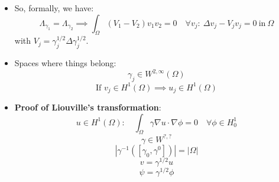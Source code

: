 \documentclass{article}
\begin{document}
\begin{itemize}
    \item So, formally, we have:
    \begin{equation}
        \Lambda_{\gamma_1} = \Lambda_{\gamma_2} \implies \int_\Omega (V_1 - V_2)v_1v_2 = 0 \quad \forall v_j: \ \Delta v_j - V_j v_j = 0 \ \text{in} \ \Omega
    \end{equation}
    with $V_j = \gamma_j^{1/2} \Delta \gamma_j^{1/2}$.

    \item Spaces where things belong:
    \begin{equation}
        \gamma_j \in W^{2, \infty}(\Omega)
    \end{equation}
    \begin{equation}
        \text{If } v_j \in H^1(\Omega) \implies u_j \in H^1(\Omega)
    \end{equation}

    \item \textbf{Proof of Liouville's transformation}:
    \begin{equation}
        u \in H^1(\Omega): \quad \int_\Omega \gamma \nabla u \cdot \nabla \phi = 0 \quad \forall \phi \in H_0^1
    \end{equation}
    \begin{equation}
        \gamma \in W^{?,?}
    \end{equation}
    \begin{equation}
        |\gamma^{-1} ([\gamma_0, \gamma^0])| = |\Omega|
    \end{equation}
    \begin{equation}
        v = \gamma^{1/2} u
    \end{equation}
    \begin{equation}
        \psi = \gamma^{1/2} \phi
    \end{equation}


\end{itemize}
\end{document}
